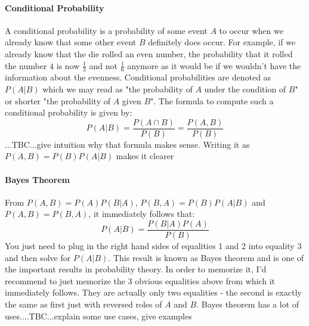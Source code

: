 


\paragraph{Conditional Probability}
A conditional probability is a probability of some event $A$ to occur when we already know that some other event $B$ definitely does occur. For example, if we already know that the die rolled an even number, the probability that it rolled the number $4$ is now $\frac{1}{3}$ and not $\frac{1}{6}$ anymore as it would be if we wouldn't have the information about the evenness. Conditional probabilities are denoted as $P(A|B)$ which we may read as "the probability of $A$ under the condition of $B$" or shorter "the probability of $A$ given $B$". The formula to compute such a conditional probability is given by:
\begin{equation}
\label{Eq:ConditionalProbability}
 P(A|B) = \frac{P(A \cap B)}{P(B)} = \frac{P(A, B)}{P(B)}
\end{equation}
...TBC...give intuition why that formula makes sense. Writing it as $P(A,B) = P(B) P(A|B)$ makes it clearer








\paragraph{Bayes Theorem}
From $P(A, B) = P(A) P(B|A)$,  $P(B, A) = P(B) P(A|B)$ and $P(A, B) = P(B, A)$, it immediately follows that:
\begin{equation}
\label{Eq:BayesTheorem}
 P(A|B) = \frac{P(B|A) P(A)}{P(B)}
\end{equation}
You just need to plug in the right hand sides of equalities 1 and 2 into equality 3 and then solve for $ P(A|B)$. This result is known as Bayes theorem and is one of the important results in probability theory. In order to memorize it, I'd recommend to just memorize the 3 obvious equalities above from which it immediately follows. They are actually only two equalities - the second is exactly the same as first just with reversed roles of $A$ and $B$. Bayes theorem has a lot of uses....TBC...explain some use cases, give examples

